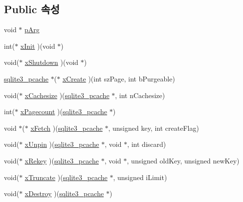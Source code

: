 \subsection*{Public 속성}
\begin{DoxyCompactItemize}
\item 
void $\ast$ \hyperlink{structsqlite3__pcache__methods_ac71a23fce5a94ac9bc6babdbbaf1b5b4}{p\+Arg}
\item 
int($\ast$ \hyperlink{structsqlite3__pcache__methods_ac75d3dbf840e6f05ea08d35ad0457fb2}{x\+Init} )(void $\ast$)
\item 
void($\ast$ \hyperlink{structsqlite3__pcache__methods_aa2835c25fac454b7ee7cfd9e625700d7}{x\+Shutdown} )(void $\ast$)
\item 
\hyperlink{sqlite3_8h_a096c453d937d51f7926d7d31c8e0bd2f}{sqlite3\+\_\+pcache} $\ast$($\ast$ \hyperlink{structsqlite3__pcache__methods_ac903d0438a7a1554c818b4c17585e790}{x\+Create} )(int sz\+Page, int b\+Purgeable)
\item 
void($\ast$ \hyperlink{structsqlite3__pcache__methods_ac9ccbed1bea2a902906bfeaa6a330b40}{x\+Cachesize} )(\hyperlink{sqlite3_8h_a096c453d937d51f7926d7d31c8e0bd2f}{sqlite3\+\_\+pcache} $\ast$, int n\+Cachesize)
\item 
int($\ast$ \hyperlink{structsqlite3__pcache__methods_a1e0895008a701c1843336f0e0dcd3f46}{x\+Pagecount} )(\hyperlink{sqlite3_8h_a096c453d937d51f7926d7d31c8e0bd2f}{sqlite3\+\_\+pcache} $\ast$)
\item 
void $\ast$($\ast$ \hyperlink{structsqlite3__pcache__methods_ae09b8ed29c2dd77157f26a69255fd482}{x\+Fetch} )(\hyperlink{sqlite3_8h_a096c453d937d51f7926d7d31c8e0bd2f}{sqlite3\+\_\+pcache} $\ast$, unsigned key, int create\+Flag)
\item 
void($\ast$ \hyperlink{structsqlite3__pcache__methods_a2aa1aefc301a0fe4998ed8397b028630}{x\+Unpin} )(\hyperlink{sqlite3_8h_a096c453d937d51f7926d7d31c8e0bd2f}{sqlite3\+\_\+pcache} $\ast$, void $\ast$, int discard)
\item 
void($\ast$ \hyperlink{structsqlite3__pcache__methods_a0d8a7a980e22e908429a181f8fc7733e}{x\+Rekey} )(\hyperlink{sqlite3_8h_a096c453d937d51f7926d7d31c8e0bd2f}{sqlite3\+\_\+pcache} $\ast$, void $\ast$, unsigned old\+Key, unsigned new\+Key)
\item 
void($\ast$ \hyperlink{structsqlite3__pcache__methods_adc097defb1e83c6442fc0d47ac79cec9}{x\+Truncate} )(\hyperlink{sqlite3_8h_a096c453d937d51f7926d7d31c8e0bd2f}{sqlite3\+\_\+pcache} $\ast$, unsigned i\+Limit)
\item 
void($\ast$ \hyperlink{structsqlite3__pcache__methods_ac775533f86db1d15bf7e4ded0e037eaf}{x\+Destroy} )(\hyperlink{sqlite3_8h_a096c453d937d51f7926d7d31c8e0bd2f}{sqlite3\+\_\+pcache} $\ast$)
\end{DoxyCompactItemize}


